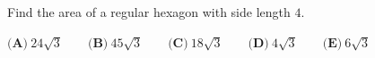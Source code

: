 Find the area of a regular hexagon with side length $4$.

$\textbf{(A)}~24\sqrt{3}\qquad\textbf{(B)}~45\sqrt{3}\qquad\textbf{(C)}~18\sqrt{3}\qquad\textbf{(D)}~4\sqrt{3}\qquad\textbf{(E)}~6\sqrt{3}\qquad$
